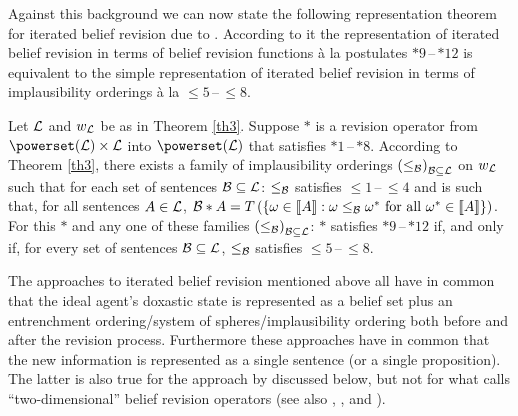 Against this background we can now state the following representation theorem for iterated belief revision due to \citet{dp97}. According to it the representation of iterated belief revision in terms of belief revision functions \`{a} la postulates $*9$\,--\,$*12$ is equivalent to the simple representation of iterated belief revision in terms of implausibility orderings \`{a} la $\leq\!\!5$\,--\,$\leq\!\!8$.
\begin{theorem}\label{th4}
Let $\cal L$ and $w_{\cal L}$ be as in Theorem \ref{th3}. Suppose $*$ is a revision operator from $\powerset\!\left(\cal L\right)\times\cal L$ into $\powerset\!\left(\cal L\right)$ that satisfies $*1$\,--\,$*8$. According to Theorem \ref{th3}, there exists a family of implausibility orderings $\left(\leq_{\cal B}\right)_{\cal B\subseteq L}$ on $w_{\cal L}$ such that for each set of sentences $\cal B\subseteq L$: $\leq_{\cal B}$ satisfies $\leq\!\!1$\,--\,$\leq\!\!4$ and is such that, for all sentences $A\in\cal L$, $\begin{cal}B\end{cal}*A=T\left(\left\{\omega\in\llbracket A\rrbracket:\omega\leq_{\cal B}\omega^*\mbox{ for all }\omega^*\in\llbracket A\rrbracket\right\}\right)$. For this $*$ and any one of these families $\left(\leq_{\cal B}\right)_{\cal B\subseteq L}$: $*$ satisfies $*9$\,--\,$*12$ if, and only if, for every set of sentences $\cal B\subseteq L$, $\leq_{\cal B}$ satisfies $\leq\!\!5$\,--\,$\leq\!\!8$.
\end{theorem}
The approaches to iterated belief revision mentioned above all have in common that the ideal agent's doxastic state is represented as a belief set plus an entrenchment ordering/system of spheres/implausibility ordering both before and after the revision process. Furthermore these approaches have in common that the new information is represented as a single sentence (or a single proposition). The latter is also true for the approach by \citet{jt07} discussed below, but not for what \citet{r09} calls ``two-dimensional'' belief revision operators (see also \citealt{c97}, \citealt{fr04}, and \citealt{r07}).

